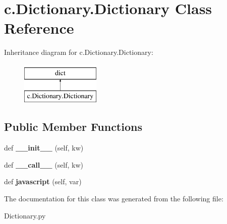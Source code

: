 \hypertarget{classc_1_1_dictionary_1_1_dictionary}{}\section{c.\+Dictionary.\+Dictionary Class Reference}
\label{classc_1_1_dictionary_1_1_dictionary}
Inheritance diagram for c.\+Dictionary.\+Dictionary\+:\begin{figure}[H]
\begin{center}
\leavevmode
\includegraphics[height=2.000000cm]{classc_1_1_dictionary_1_1_dictionary}
\end{center}
\end{figure}
\subsection*{Public Member Functions}
\begin{DoxyCompactItemize}
\item 
\hypertarget{classc_1_1_dictionary_1_1_dictionary_ad6a8119219762f8c4da0e5011021797c}{}def {\bfseries \+\_\+\+\_\+init\+\_\+\+\_\+} (self, kw)\label{classc_1_1_dictionary_1_1_dictionary_ad6a8119219762f8c4da0e5011021797c}

\item 
\hypertarget{classc_1_1_dictionary_1_1_dictionary_abe20112940995369f0ea90f5a41e6f46}{}def {\bfseries \+\_\+\+\_\+call\+\_\+\+\_\+} (self, kw)\label{classc_1_1_dictionary_1_1_dictionary_abe20112940995369f0ea90f5a41e6f46}

\item 
\hypertarget{classc_1_1_dictionary_1_1_dictionary_a9a91fbd81961f78f8e4b777db28e89f7}{}def {\bfseries javascript} (self, var)\label{classc_1_1_dictionary_1_1_dictionary_a9a91fbd81961f78f8e4b777db28e89f7}

\end{DoxyCompactItemize}


The documentation for this class was generated from the following file\+:\begin{DoxyCompactItemize}
\item 
Dictionary.\+py\end{DoxyCompactItemize}
